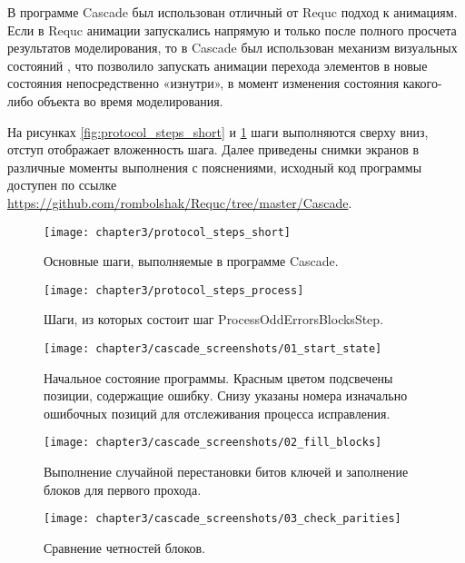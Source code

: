В программе Cascade был использован отличный от Requc подход к анимациям. Если в Requc анимации запускались напрямую и только после полного просчета результатов моделирования, то в Cascade был использован механизм визуальных состояний \cite{visual_state_manager}, что позволило запускать анимации перехода элементов в новые состояния непосредственно «изнутри», в момент изменения состояния какого-либо объекта во время моделирования.

На рисунках \ref{fig:protocol_steps_short} и \ref{fig:protocol_steps_process} шаги выполняются сверху вниз, отступ отображает вложенность шага. Далее приведены снимки экранов в различные моменты выполнения с пояснениями, исходный код программы доступен по ссылке \url{https://github.com/rombolshak/Requc/tree/master/Cascade}.

\begin{figure}[h]
\begin{center}
  \begin{minipage}[h]{0.4\linewidth}
    \texttt{[image: chapter3/protocol\_steps\_short]}
    \caption{Основные шаги, выполняемые в программе Cascade.}
    \label{fig:protocol_steps_short}
  \end{minipage}
  \hfill 
  \begin{minipage}[h]{0.4\linewidth}
    \texttt{[image: chapter3/protocol\_steps\_process]}
    \caption{Шаги, из которых состоит шаг ProcessOddErrorsBlocksStep.}
    \label{fig:protocol_steps_process}
  \end{minipage}
\end{center}  
\end{figure}

\FloatBarrier
\begin{figure}[h]
  \texttt{[image: chapter3/cascade\_screenshots/01\_start\_state]}
  \caption{Начальное состояние программы. Красным цветом подсвечены позиции, содержащие ошибку. Снизу указаны номера изначально ошибочных позиций для отслеживания процесса исправления.}
\end{figure}

\begin{figure}[h]
  \texttt{[image: chapter3/cascade\_screenshots/02\_fill\_blocks]}
  \caption{Выполнение случайной перестановки битов ключей и заполнение блоков для первого прохода.}
\end{figure}

\begin{figure}[h]
  \texttt{[image: chapter3/cascade\_screenshots/03\_check\_parities]}
  \caption{Сравнение четностей блоков.}
\end{figure}

